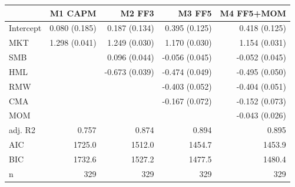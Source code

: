 \begin{tabular}{lrrrr}
\toprule
 & M1 CAPM & M2 FF3 & M3 FF5 & M4 FF5+MOM \\
\midrule
Intercept & 0.080 (0.185) & 0.187 (0.134) & 0.395 (0.125) & 0.418 (0.125) \\
MKT & 1.298 (0.041) & 1.249 (0.030) & 1.170 (0.030) & 1.154 (0.031) \\
SMB &  & 0.096 (0.044) & -0.056 (0.045) & -0.052 (0.045) \\
HML &  & -0.673 (0.039) & -0.474 (0.049) & -0.495 (0.050) \\
RMW &  &  & -0.403 (0.052) & -0.404 (0.051) \\
CMA &  &  & -0.167 (0.072) & -0.152 (0.073) \\
MOM &  &  &  & -0.043 (0.026) \\
adj. R2 & 0.757 & 0.874 & 0.894 & 0.895 \\
AIC & 1725.0 & 1512.0 & 1454.7 & 1453.9 \\
BIC & 1732.6 & 1527.2 & 1477.5 & 1480.4 \\
n & 329 & 329 & 329 & 329 \\
\bottomrule
\end{tabular}
